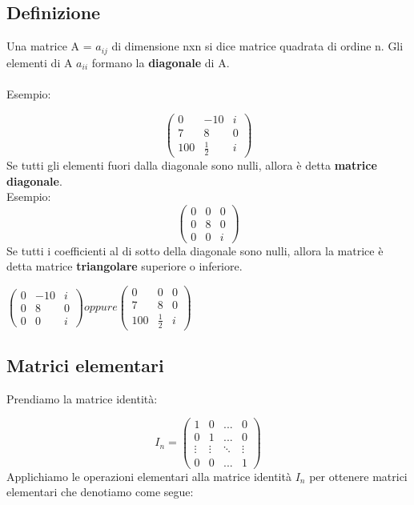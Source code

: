 \documentclass[12pt]{article}
\begin{document}
\subsection{Definizione}

Una matrice A = $a_{ij}$ di dimensione nxn si dice matrice quadrata di ordine n. Gli elementi di A $a_{ii}$ formano la \textbf{diagonale} di A.
\\\\
Esempio:

\[\begin{pmatrix}
    0 & -10 & i\\
    7 & 8 & 0\\
    100 & \frac{1}{2} & i
\end{pmatrix}\]
Se tutti gli elementi fuori dalla diagonale sono nulli, allora è detta \textbf{matrice diagonale}.
\\
Esempio:
\[\begin{pmatrix}
    0 & 0 & 0\\
    0 & 8 & 0\\
    0 & 0 & i
\end{pmatrix}\]
Se tutti i coefficienti al di sotto della diagonale sono nulli, allora la matrice è detta matrice \textbf{triangolare} superiore o inferiore.

\begin{center}
    $\begin{pmatrix}
        0 & -10 & i\\
        0 & 8 & 0\\
        0 & 0 & i
    \end{pmatrix} oppure \begin{pmatrix}
        0 & 0 & 0\\
        7 & 8 & 0\\
        100 & \frac{1}{2} & i
    \end{pmatrix} $
\end{center}

\subsection{Matrici elementari}

Prendiamo la matrice identità:

\[I_n = \begin{pmatrix}
    1 & 0 & ... & 0\\
    0 & 1 & ... & 0\\
    \vdots & \vdots & \ddots & \vdots\\
    0 & 0 & ... & 1
\end{pmatrix}\]
Applichiamo le operazioni elementari alla matrice identità $I_n$ per ottenere matrici elementari che denotiamo come segue:
\end{document}
